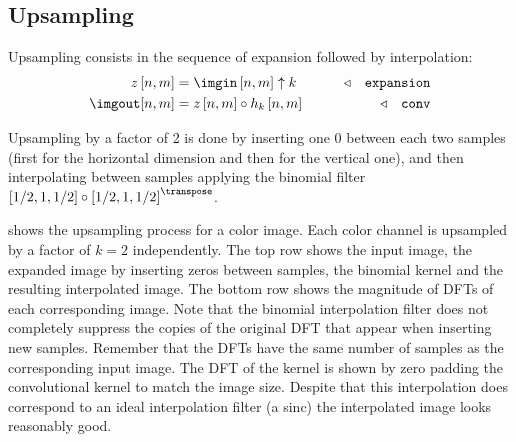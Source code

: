 


\subsection{Upsampling}

Upsampling consists in the sequence of expansion followed by interpolation:
\begin{align}
	z \left[n,m\right] & = \imgin \left[n,m\right] \uparrow k
	                   & \quad\quad \triangleleft \quad \texttt{expansion}                                                \\
	\imgout [n,m]      & = z \left[n,m\right] \circ h_k \left[n,m\right]   & \quad\quad \triangleleft \quad \texttt{conv}
\end{align}



Upsampling by a factor of 2 is done by inserting one 0 between each two samples (first for the horizontal dimension and then for the vertical one), and then interpolating between samples applying the binomial filter $\left[1/2,1,1/2\right] \circ \left[1/2,1,1/2\right]^\transpose$.

\Fig{\ref{fig:upsamplingazebra}} shows the upsampling process for a color image. Each color channel is upsampled by a factor of $k=2$ independently. The top row shows the input image, the expanded image by inserting zeros between samples, the binomial kernel and the resulting interpolated image. The bottom row shows the magnitude of DFTs of each corresponding image. Note that the binomial interpolation filter does not completely suppress  the copies of the original DFT that appear when inserting new samples. Remember that the DFTs have the same number of samples as the corresponding input image. The DFT of the kernel is shown by zero padding the convolutional kernel to match the image size. Despite that this interpolation does correspond to an ideal interpolation filter (a sinc) the interpolated image looks reasonably good.



